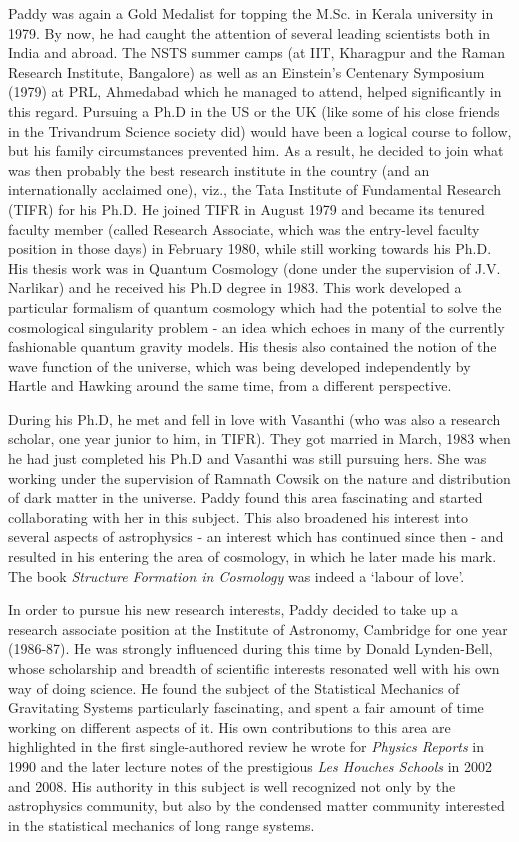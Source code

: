 \documentclass[prd, preprint, longbibliography, 12pt]{revtex4-2}
\begin{document}
Paddy was again a Gold Medalist for topping the
M.Sc. in Kerala university in 1979.
By now, he had caught  the attention of  several leading scientists
both in India and abroad.
The NSTS summer camps (at IIT, Kharagpur  and the Raman Research
Institute, Bangalore) as well as an Einstein's Centenary Symposium
(1979) at PRL, Ahmedabad which he managed to attend, helped
significantly in this regard.
Pursuing a Ph.D in the US or the UK (like some of his close friends in
the Trivandrum Science society did) would have been a logical course
to follow, but his family circumstances prevented him.
As a result, he decided to join what was then probably the best
research institute in the country (and an internationally acclaimed
one), viz., the Tata Institute of Fundamental Research (TIFR) for his
Ph.D.
He joined TIFR in August 1979 and became its tenured faculty member
(called Research Associate, which was the entry-level faculty position
in those days) in February 1980, while still working towards his
Ph.D.
His thesis work was in Quantum Cosmology (done under the supervision
of J.V. Narlikar) and he received his Ph.D degree  in 1983.
This work developed a particular formalism of quantum cosmology which
had the potential to  solve the cosmological singularity problem - an
idea which echoes in many of the currently fashionable  quantum
gravity models.
His thesis also contained  the notion of the wave function of the
universe, which was being developed independently by Hartle and
Hawking around the same time, from a different perspective.  

During his Ph.D, he met and fell in love with Vasanthi (who was also a
research scholar, one year junior to him, in TIFR).
They got married in March, 1983 when he had just completed his Ph.D
and Vasanthi was still pursuing hers.
She was working under the supervision of Ramnath Cowsik on the nature
and distribution of dark matter in the universe.
Paddy found this area fascinating and started collaborating with her
in this subject.
This also broadened his interest into several aspects of astrophysics
- an interest which has continued since then - and resulted in his
entering the area of cosmology, in which he later made his mark.
The book {\sl Structure Formation in Cosmology} was indeed a `labour of love'. 

In order to pursue his new research interests, Paddy decided to take
up a research associate position at the  Institute of Astronomy,
Cambridge for one year (1986-87).
He was strongly influenced during this time by Donald Lynden-Bell,
whose scholarship and breadth of scientific interests resonated well
with his own way of doing science.
He found the subject of the Statistical Mechanics of Gravitating
Systems particularly fascinating, and spent a fair amount of time
working on different aspects of it.
His own contributions to this area are highlighted in the first
single-authored review he wrote for \textit{Physics Reports} in 1990
and the later lecture notes of the prestigious \textit{Les Houches
  Schools} in 2002 and 2008.
His authority in  this subject is well recognized not only by the
astrophysics community, but also by the condensed matter community
interested in the statistical mechanics of long range systems. 
\end{document}
